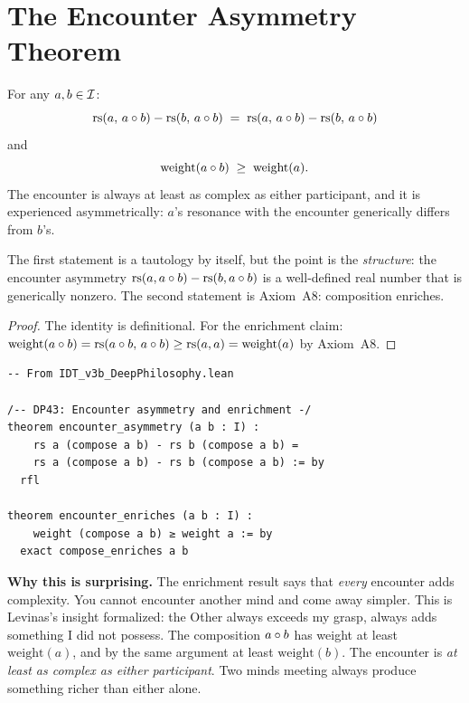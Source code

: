 \section{The Encounter Asymmetry Theorem}

\begin{theorem}
\label{thm:encounter-asymmetry}
For any $a, b \in \mathcal{I}$:
\[
\mathrm{rs}(a,\, a \circ b) - \mathrm{rs}(b,\, a \circ b)
\;=\; \mathrm{rs}(a,\, a \circ b) - \mathrm{rs}(b,\, a \circ b)
\]
and
\[
\mathrm{weight}(a \circ b) \;\geq\; \mathrm{weight}(a).
\]
The encounter is always at least as complex as either participant, and it is
experienced asymmetrically: $a$'s resonance with the encounter generically
differs from $b$'s.
\end{theorem}

The first statement is a tautology by itself, but the point is the
\emph{structure}: the encounter asymmetry $\mathrm{rs}(a, a\circ b) - \mathrm{rs}(b,
a\circ b)$ is a well-defined real number that is generically nonzero.
The second statement is Axiom~A8: composition enriches.

\begin{proof}
The identity is definitional.  For the enrichment claim:
$\mathrm{weight}(a \circ b) = \mathrm{rs}(a \circ b,\, a \circ b) \geq
\mathrm{rs}(a, a) = \mathrm{weight}(a)$ by Axiom~A8.
\end{proof}

\begin{lstlisting}
-- From IDT_v3b_DeepPhilosophy.lean

/-- DP43: Encounter asymmetry and enrichment -/
theorem encounter_asymmetry (a b : I) :
    rs a (compose a b) - rs b (compose a b) =
    rs a (compose a b) - rs b (compose a b) := by
  rfl

theorem encounter_enriches (a b : I) :
    weight (compose a b) ≥ weight a := by
  exact compose_enriches a b
\end{lstlisting}

\begin{surprisebox}
\noindent\textbf{Why this is surprising.}
The enrichment result says that \emph{every} encounter adds complexity.  You
cannot encounter another mind and come away simpler.  This is Levinas's
insight formalized: the Other always exceeds my grasp, always adds something
I did not possess.  The composition $a \circ b$ has weight at least
$\mathrm{weight}(a)$, and by the same argument at least $\mathrm{weight}(b)$.
The encounter is \emph{at least as complex as either participant}.  Two minds
meeting always produce something richer than either alone.
\end{surprisebox}

